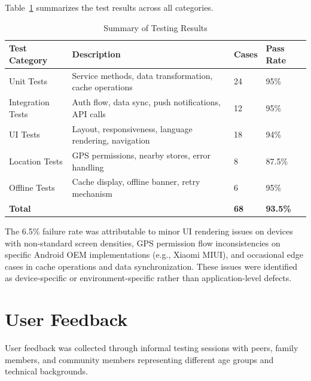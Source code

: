 Table~\ref{tab:test_summary} summarizes the test results across all categories.

\begin{table}[H]
\centering
\caption{Summary of Testing Results}
\label{tab:test_summary}
\begin{tabularx}{\textwidth}{|l|X|l|l|}
\hline
\textbf{Test Category} & \textbf{Description} & \textbf{Cases} & \textbf{Pass Rate} \\
\hline
Unit Tests & Service methods, data transformation, cache operations & 24 & 95\% \\
\hline
Integration Tests & Auth flow, data sync, push notifications, API calls & 12 & 95\% \\
\hline
UI Tests & Layout, responsiveness, language rendering, navigation & 18 & 94\% \\
\hline
Location Tests & GPS permissions, nearby stores, error handling & 8 & 87.5\% \\
\hline
Offline Tests & Cache display, offline banner, retry mechanism & 6 & 95\% \\
\hline
\textbf{Total} & & \textbf{68} & \textbf{93.5\%} \\
\hline
\end{tabularx}
\end{table}

The 6.5\% failure rate was attributable to minor UI rendering issues on devices with non-standard screen densities, GPS permission flow inconsistencies on specific Android OEM implementations (e.g., Xiaomi MIUI), and occasional edge cases in cache operations and data synchronization. These issues were identified as device-specific or environment-specific rather than application-level defects.

\section{User Feedback}

User feedback was collected through informal testing sessions with peers, family members, and community members representing different age groups and technical backgrounds.

